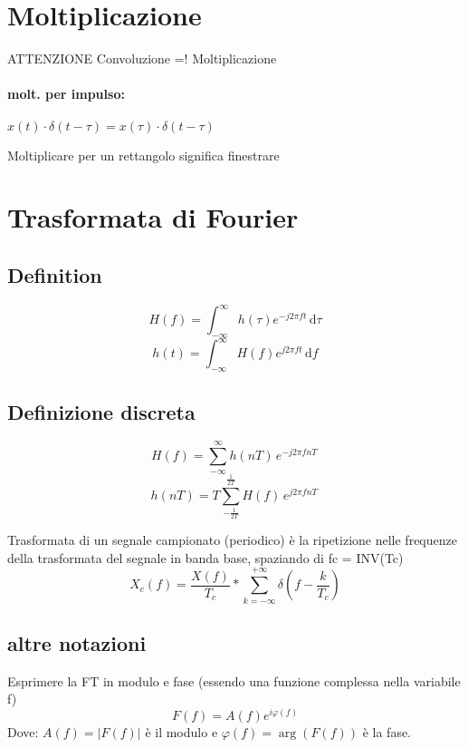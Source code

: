 \documentclass[12pt,a4paper,]{article}
\begin{document}
\section{Moltiplicazione}
ATTENZIONE Convoluzione =! Moltiplicazione

\paragraph{molt. per impulso:}$x(t)\cdot\delta(t-\tau) = x(\tau)\cdot\delta(t-\tau)$


Moltiplicare per un rettangolo significa finestrare
\section{Trasformata di Fourier}
\subsection{Definition}
\begin{equation}
H(f) = \int_{-\infty}^{\infty} \! h(\tau) e^{-j2\pi ft} \, \mathrm{d}\tau
\end{equation}
\begin{equation}
h(t) = \int_{-\infty}^{\infty} \! H(f) e^{j2\pi ft} \, \mathrm{d}f
\end{equation}
\subsection{Definizione discreta}
\begin{equation}
H(f) = \sum_{-\infty}^{\infty} \! h(nT) \,  e^{-j2\pi fnT} \, 
\end{equation}
\begin{equation}
h(nT) =T  \sum_{-\frac{1}{2T}}^{\frac{1}{2T}} \! H(f) \, e^{j2\pi fnT} \,
\end{equation}

Trasformata di un segnale campionato (periodico) è la ripetizione nelle frequenze della trasformata del segnale in banda base, spaziando di fc = INV(Tc)
\begin{equation}
X_{c} (f) = \frac{X(f)}{T_{c}} \ast \sum_{k = -\infty}^{+\infty} \delta \left(f-\frac{k}{T_{c}}\right)
\end{equation}
\subsection{altre notazioni}
Esprimere la FT in modulo e fase (essendo una funzione complessa nella variabile f)
\begin{equation}
 F(f) = A(f) e^{i\varphi(f)}
\end{equation}
Dove:  $A(f) = \left| F(f)\right|$ è il modulo e $\varphi (f) = \arg \left( F(f) \right)$ è la fase. 
\end{document}
